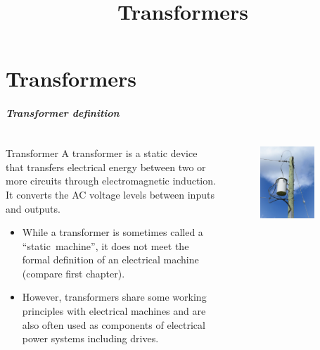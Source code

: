 \part{Transformers}
\title{Transformers}  
\date{}  
\frame{\titlepage} 

\begin{frame}
	\frametitle{Transformer definition}
    \begin{columns}
		\begin{column}{0.65\textwidth}
            \begin{varblock}{Transformer}
                A transformer is a static device that transfers electrical energy between two or more circuits through electromagnetic induction. It converts the AC voltage levels between inputs and outputs.   
            \end{varblock}
            \begin{itemize}
                \item<2-> While a transformer is sometimes called a ``static~machine'', it does not meet the formal definition of an electrical machine (compare first chapter).
                \item<3-> However, transformers share some working principles with electrical machines and are also often used as components of electrical power systems including drives.
            \end{itemize}
		\end{column}
        \hfill
		\begin{column}{0.35\textwidth}
			\onslide<1->
			\begin{figure}
				\centering
				\includegraphics[width=0.75\textwidth]{fig/lec04/Transformer_rural_pole.jpg}

\end{figure}
\end{column}
\end{columns}
\end{frame}
